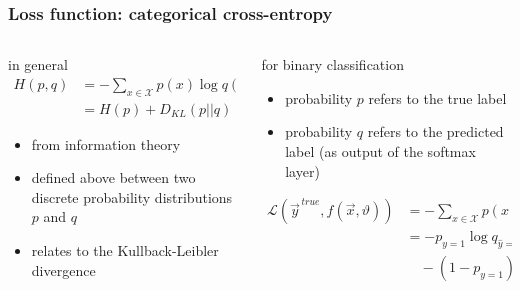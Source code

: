 \documentclass[
  aspectratio=1610, %
  intlimits %
]{beamer}
\begin{document}
\begin{frame}
 \frametitle{Loss function: categorical cross-entropy}

 \begin{columns}
 \begin{column}{.49\textwidth}
 \begin{exampleblock}{in general}
   \begin{align*}
     H(p, q) &= - \sum_{x \in \mathcal{X}} p(x) \log q(x)\\
             &= H(p) + D_{KL}(p || q)
 \end{align*}
   \begin{itemize}
   \item from information theory
   \item defined above between two discrete probability distributions $p$ and $q$
   \item relates to the Kullback-Leibler divergence
   \end{itemize}
 \end{exampleblock}
\end{column}

 \begin{column}{.49\textwidth}
 \begin{exampleblock}{for binary classification}
   \begin{itemize}
   \item probability $p$ refers to the true label
   \item probability $q$ refers to the predicted label (as output of the softmax layer)
 \end{itemize}
 
   \begin{align*}
 \mathcal{L}( \vec{y}^{\,true}, f(\vec{x}, \vartheta)) &= - \sum_{x \in \mathcal{X}} p(x) \log q(x) \\
                                             &= - p_{y=1} \log q_{\hat{y}=1} \\
                                               &\quad - (1-p_{y=1}) \log (1-q_{\hat{y}=1})
   \end{align*}
   
\end{exampleblock}

\end{column}
\end{columns}


\end{frame}
\end{document}
